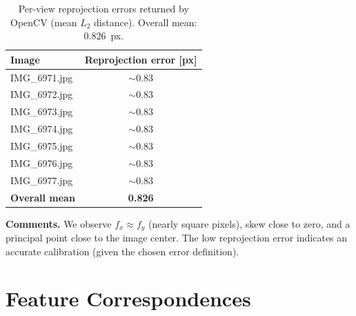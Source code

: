 \documentclass{article}
\begin{document}
\begin{table}[h]
\centering
\begin{tabular}{l c}
\toprule
Image & Reprojection error [px] \\
\midrule
IMG\_6971.jpg & $\sim$0.83 \\
IMG\_6972.jpg & $\sim$0.83 \\
IMG\_6973.jpg & $\sim$0.83 \\
IMG\_6974.jpg & $\sim$0.83 \\
IMG\_6975.jpg & $\sim$0.83 \\
IMG\_6976.jpg & $\sim$0.83 \\
IMG\_6977.jpg & $\sim$0.83 \\
\midrule
\textbf{Overall mean} & \textbf{0.826} \\
\bottomrule
\end{tabular}
\caption{Per-view reprojection errors returned by OpenCV (mean $L_2$ distance). Overall mean: 0.826~px.}
\label{tab:per_view_err}
\end{table}

\noindent\textbf{Comments.}
We observe $f_x \approx f_y$ (nearly square pixels), skew close to zero, and a principal point close to the image center.
The low reprojection error indicates an accurate calibration (given the chosen error definition).



\section{Feature Correspondences}
\end{document}
